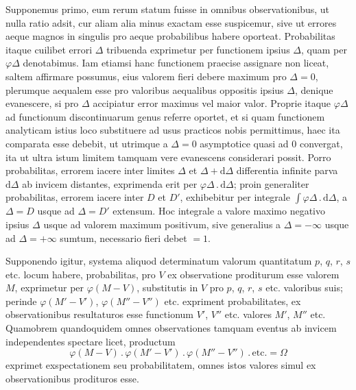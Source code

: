 Supponemus primo, eum rerum statum fuisse in omnibus observationibus, ut
nulla ratio adsit, cur aliam alia minus exactam esse suspicemur, sive ut
errores aeque magnos in singulis pro aeque probabilibus habere oporteat.
Probabilitas itaque cuilibet errori $\Delta$ tribuenda exprimetur per functionem
ipsius $\Delta$, quam per $\varphi\Delta$ denotabimus. Iam etiamsi hanc
functionem praecise assignare non liceat, saltem affirmare possumus, eius
valorem fieri debere maximum pro $\Delta=0$, plerumque aequalem esse pro
valoribus aequalibus oppositis ipsius $\Delta$, denique evanescere, si pro
$\Delta$ accipiatur error maximus vel maior valor. Proprie itaque
$\varphi\Delta$ ad functionum discontinuarum genus referre oportet, et si
quam functionem analyticam istius loco substituere ad usus practicos nobis
permittimus, haec ita comparata esse debebit, ut utrimque a $\Delta=0$
asymptotice quasi ad $0$ convergat, ita ut ultra istum limitem tamquam vere
evanescens considerari possit. Porro probabilitas, errorem iacere inter
limites $\Delta$ et $\Delta+\mathrm{d}\Delta$ differentia infinite parva
$\mathrm{d}\Delta$ ab invicem distantes, exprimenda erit per
$\varphi\Delta\, .\,\mathrm{d}\Delta$; proin generaliter probabilitas,
errorem iacere inter $D$ et $D'$, exhibebitur per integrale
$\int\varphi\Delta\, .\,\mathrm{d}\Delta$, a $\Delta=D$ usque ad $\Delta=D'$
extensum. Hoc integrale a valore maximo negativo ipsius $\Delta$ usque ad
valorem maximum positivum, sive generalius a $\Delta=-\infty$ usque ad
$\Delta=+\infty$ sumtum, necessario fieri debet $=1$.

Supponendo igitur, systema aliquod determinatum valorum quantitatum $p$,
$q$, $r$, $s$ etc. locum habere, probabilitas, pro $V$ ex observatione
proditurum esse valorem $M$, exprimetur per $\varphi(M-V)$, substitutis
in $V$ pro $p$, $q$, $r$, $s$ etc. valoribus suis; perinde
$\varphi(M'-V')$, $\varphi(M''-V'')$ etc. expriment probabilitates, ex
observationibus resultaturos esse functionum $V'$, $V''$ etc. valores $M'$,
$M''$ etc. Quamobrem quandoquidem omnes observationes tamquam eventus ab
invicem independentes spectare licet, productum
\[
\varphi(M-V)\, .\,\varphi(M'-V')\, .\,\varphi(M''-V'')\, .\,\text{etc.}=\Omega
\]
exprimet exspectationem seu probabilitatem, omnes istos valores simul ex
observationibus prodituros esse.
